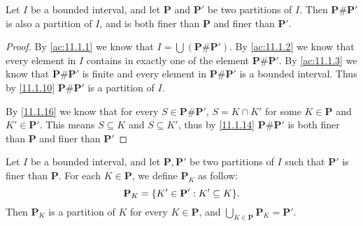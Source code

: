 \setcounter{thm}{17}
\begin{lem}\label{11.1.18}
  Let \(I\) be a bounded interval, and let \(\mathbf{P}\) and \(\mathbf{P}'\) be two partitions of \(I\).
  Then \(\mathbf{P} \# \mathbf{P}'\) is also a partition of \(I\), and is both finer than \(\mathbf{P}\) and finer than \(\mathbf{P}'\).
\end{lem}

\begin{proof}
  By \cref{ac:11.1.1} we know that \(I = \bigcup (\mathbf{P} \# \mathbf{P}')\).
  By \cref{ac:11.1.2} we know that every element in \(I\) contains in exactly one of the element \(\mathbf{P} \# \mathbf{P}'\).
  By \cref{ac:11.1.3} we know that \(\mathbf{P} \# \mathbf{P}'\) is finite and every element in  \(\mathbf{P} \# \mathbf{P}'\) is a bounded interval.
  Thus by \cref{11.1.10} \(\mathbf{P} \# \mathbf{P}'\) is a partition of \(I\).

  By \cref{11.1.16} we know that for every \(S \in \mathbf{P} \# \mathbf{P}'\), \(S = K \cap K'\) for some \(K \in \mathbf{P}\) and \(K' \in \mathbf{P}'\).
  This means \(S \subseteq K\) and \(S \subseteq K'\), thus by \cref{11.1.14} \(\mathbf{P} \# \mathbf{P}'\) is both finer than \(\mathbf{P}\) and finer than \(\mathbf{P}'\)
\end{proof}

\begin{ac}\label{ac:11.1.4}
  Let \(I\) be a bounded interval, and let \(\mathbf{P}, \mathbf{P}'\) be two partitions of \(I\) such that \(\mathbf{P}'\) is finer than \(\mathbf{P}\).
  For each \(K \in \mathbf{P}\), we define \(\mathbf{P}_K\) as follow:
  \[
    \mathbf{P}_K = \set{K' \in \mathbf{P}' : K' \subseteq K}.
  \]
  Then \(\mathbf{P}_K\) is a partition of \(K\) for every \(K \in \mathbf{P}\), and \(\bigcup_{K \in \mathbf{P}} \mathbf{P}_K = \mathbf{P}'\).
\end{ac}

